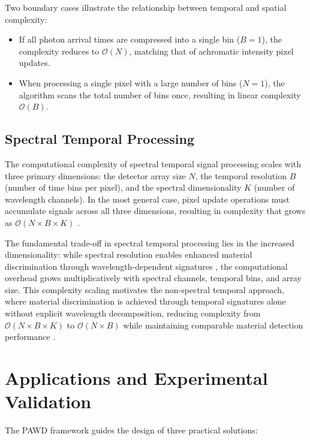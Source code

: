 \documentclass[11pt]{article}
\begin{document}
Two boundary cases illustrate the relationship between temporal and spatial complexity:
\begin{itemize}
    \item If all photon arrival times are compressed into a single bin ($B = 1$), the complexity reduces to $\mathcal{O}(N)$, matching that of achromatic intensity pixel updates.
    \item When processing a single pixel with a large number of bins ($N = 1$), the algorithm scans the total number of bins once, resulting in linear complexity $\mathcal{O}(B)$.
\end{itemize}

\subsection{Spectral Temporal Processing}

The computational complexity of spectral temporal signal processing scales with three primary dimensions: the detector array size $N$, the temporal resolution $B$ (number of time bins per pixel), and the spectral dimensionality $K$ (number of wavelength channels). In the most general case, pixel update operations must accumulate signals across all three dimensions, resulting in complexity that grows as $\mathcal{O}(N \times B \times K)$ \cite{knuth1976}.

The fundamental trade-off in spectral temporal processing lies in the increased dimensionality: while spectral resolution enables enhanced material discrimination through wavelength-dependent signatures \cite{inagaki2020,heinz2001}, the computational overhead grows multiplicatively with spectral channels, temporal bins, and array size. This complexity scaling motivates the non-spectral temporal approach, where material discrimination is achieved through temporal signatures alone without explicit wavelength decomposition, reducing complexity from $\mathcal{O}(N \times B \times K)$ to $\mathcal{O}(N \times B)$ while maintaining comparable material detection performance \cite{su2016,becker2023}.

\section{Applications and Experimental Validation}

The PAWD framework guides the design of three practical solutions:
\end{document}
